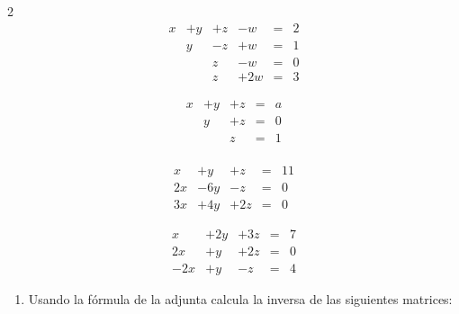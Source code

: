 \documentclass[
]{article}
\providecommand{\tightlist}{%
  \setlength{\itemsep}{0pt}\setlength{\parskip}{0pt}}
\begin{document}
\begin{multicols}{2}
\begin{equation*}
\begin{array}{cccccc}
x & + y &+ z &- w & = & 2  \\
  &   y &- z &+w  & = & 1  \\
  &     &  z &-w  & = & 0  \\
  &     &  z &+2w & = & 3
\end{array}
\end{equation*}

\begin{equation*}
\begin{array}{ccccc}
x & +y & +z & = & a \\
  & y  & +z & = & 0 \\
  &    & z  & = & 1 \\
\end{array}
\end{equation*}

\begin{equation*}
\begin{array}{ccccc}
x & + y &+ z  & = & 11  \\
2x& -6y &- z  & = & 0  \\
3x& +4y &+2z  & = & 0  
\end{array}
\end{equation*}

\begin{equation*}
\begin{array}{ccccc}
x & +2y & +3z & = & 7 \\
2x& +y  & +2z & = & 0 \\
-2x&+y  & -z  & = & 4 
\end{array}
\end{equation*}
\end{multicols}

\begin{enumerate}
\def\labelenumi{\arabic{enumi}.}
\setcounter{enumi}{1}
\tightlist
\item
  Usando la fórmula de la adjunta calcula la inversa de las siguientes
  matrices:
\end{enumerate}
\end{document}
